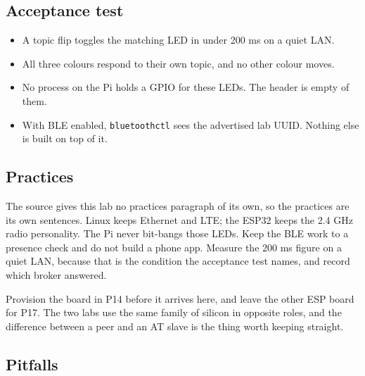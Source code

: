 \subsection*{Acceptance test}

\begin{itemize}
\item A topic flip toggles the matching LED in under 200 ms on a quiet LAN.
\item All three colours respond to their own topic, and no other colour moves.
\item No process on the Pi holds a GPIO for these LEDs. The header is empty of them.
\item With BLE enabled, \texttt{bluetoothctl} sees the advertised lab UUID. Nothing else is built on top of it.
\end{itemize}

\subsection*{Practices}

The source gives this lab no practices paragraph of its own, so the practices are its own sentences. Linux keeps Ethernet and LTE; the ESP32 keeps the 2.4 GHz radio personality. The Pi never bit-bangs those LEDs. Keep the BLE work to a presence check and do not build a phone app. Measure the 200 ms figure on a quiet LAN, because that is the condition the acceptance test names, and record which broker answered.

Provision the board in P14 before it arrives here, and leave the other ESP board for P17. The two labs use the same family of silicon in opposite roles, and the difference between a peer and an AT slave is the thing worth keeping straight.

\subsection*{Pitfalls}

